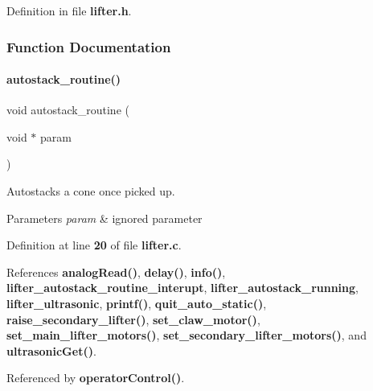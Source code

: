 Definition in file \textbf{ lifter.\+h}.



\subsubsection{Function Documentation}
\mbox{\label{lifter_8h_a8a64fa88b389b39c236c5c57a7fb5c67}} 
\paragraph{autostack\+\_\+routine()}
{\footnotesize\ttfamily void autostack\+\_\+routine (\begin{DoxyParamCaption}\item[{void $\ast$}]{param }\end{DoxyParamCaption})}



Autostacks a cone once picked up. 


\begin{DoxyParams}{Parameters}
{\em param} & ignored parameter \\
\hline
\end{DoxyParams}


Definition at line \textbf{ 20} of file \textbf{ lifter.\+c}.



References \textbf{ analog\+Read()}, \textbf{ delay()}, \textbf{ info()}, \textbf{ lifter\+\_\+autostack\+\_\+routine\+\_\+interupt}, \textbf{ lifter\+\_\+autostack\+\_\+running}, \textbf{ lifter\+\_\+ultrasonic}, \textbf{ printf()}, \textbf{ quit\+\_\+auto\+\_\+static()}, \textbf{ raise\+\_\+secondary\+\_\+lifter()}, \textbf{ set\+\_\+claw\+\_\+motor()}, \textbf{ set\+\_\+main\+\_\+lifter\+\_\+motors()}, \textbf{ set\+\_\+secondary\+\_\+lifter\+\_\+motors()}, and \textbf{ ultrasonic\+Get()}.



Referenced by \textbf{ operator\+Control()}.


